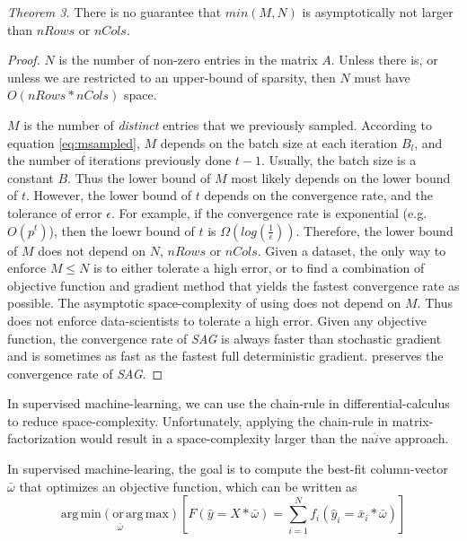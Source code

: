 \emph{Theorem 3.}  
There is no guarantee that $min(M,N)$ is asymptotically not larger than $nRows$ or $nCols$.
\begin{proof}
$N$ is the number of non-zero entries in the matrix $A$.
Unless there is, or unless we are restricted to an upper-bound of sparsity, then $N$ must have $O(nRows*nCols)$ space.

$M$ is the number of \emph{distinct} entries that we previously sampled.
According to equation \ref{eq:msampled}, $M$ depends on the batch size at each iteration $B_l$, and the number of iterations previously done $t-1$.
Usually, the batch size is a constant $B$.  Thus the lower bound of $M$ most likely depends on the lower bound of $t$.
However, the lower bound of $t$ depends on the convergence rate, and the tolerance of error $\epsilon$.
For example, if the convergence rate is exponential (e.g. $O(p^t)$), then the loewr bound of $t$ is $\Omega(log(\frac{1}{\epsilon}))$.
Therefore, the lower bound of $M$ does not depend on $N$, $nRows$ or $nCols$.
Given a dataset, the only way to enforce $M \leq N$ is to either tolerate a high error, or to find a combination of objective function and gradient method that yields the fastest convergence rate as possible.
The asymptotic space-complexity of using \tool does not depend on $M$.
Thus \tool does not enforce data-scientists to tolerate a high error.
Given any objective function, the convergence rate of \emph{SAG} \cite{schmidt2013minimizing, roux2012stochastic} is always faster than stochastic gradient and is sometimes as fast as the fastest full deterministic gradient.
\tool preserves the convergence rate of \emph{SAG}.
\end{proof}

In supervised machine-learning, we can use the chain-rule in differential-calculus to reduce space-complexity.
Unfortunately, applying the chain-rule in matrix-factorization would result in a space-complexity larger than the na$\ddot{i}$ve approach.

In supervised machine-learing, the goal is to compute the best-fit column-vector $\bar{\omega}$ that optimizes an objective function, which can be written as
\begin{equation} \label{eq:sml}
\operatorname*{arg\,min (or\,arg\,max)}_{\bar{\omega}} \left[F(\hat{y} = X*\bar{\omega}) = \sum_{i=1}^{N} f_{i}(\hat{y}_{i} = \bar{x}_{i}*\bar{\omega}) \right]
\end{equation}

